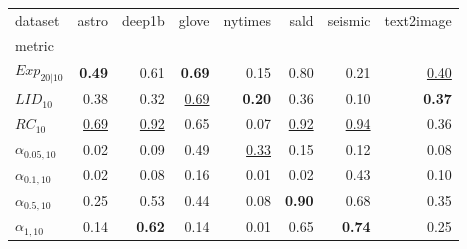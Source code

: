 \begin{tabular}{lrrrrrrr}
dataset & astro & deep1b & glove & nytimes & sald & seismic & text2image \\
metric &  &  &  &  &  &  &  \\
$Exp_{20|10}$ & \textbf{0.49} & 0.61 & \textbf{0.69} & 0.15 & 0.80 & 0.21 & \underline{0.40} \\
$LID_{10}$ & 0.38 & 0.32 & \underline{0.69} & \textbf{0.20} & 0.36 & 0.10 & \textbf{0.37} \\
$RC_{10}$ & \underline{0.69} & \underline{0.92} & 0.65 & 0.07 & \underline{0.92} & \underline{0.94} & 0.36 \\
$\alpha_{0.05, 10}$ & 0.02 & 0.09 & 0.49 & \underline{0.33} & 0.15 & 0.12 & 0.08 \\
$\alpha_{0.1, 10}$ & 0.02 & 0.08 & 0.16 & 0.01 & 0.02 & 0.43 & 0.10 \\
$\alpha_{0.5, 10}$ & 0.25 & 0.53 & 0.44 & 0.08 & \textbf{0.90} & 0.68 & 0.35 \\
$\alpha_{1, 10}$ & 0.14 & \textbf{0.62} & 0.14 & 0.01 & 0.65 & \textbf{0.74} & 0.25 \\
\end{tabular}
